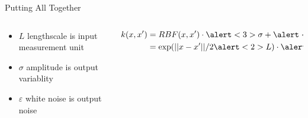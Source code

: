 \documentclass{beamer}
\begin{document}
\begin{frame}{Putting All Together}
    \begin{columns}
        \begin{column}{0.5\linewidth}
        \begin{itemize}
            \item<2-|alert@2> $L$ lengthscale is input measurement unit
            \item<3-|alert@3> $\sigma$ amplitude is output variablity
            \item<4-|alert@4> $\varepsilon$ white noise is output noise
        \end{itemize}
        \end{column}
        \begin{column}{0.5\linewidth}
            \begin{align*}
                k(x, x') &= RBF(x, x')\cdot \alert<3>{\sigma} + \alert<4>{\varepsilon}\\
                &= \exp(||x - x'||/2\alert<2>{L})\cdot \alert<3>{\sigma} + \alert<4>{\varepsilon}
            \end{align*}
        \end{column}
    \end{columns}
\end{frame}
\end{document}
